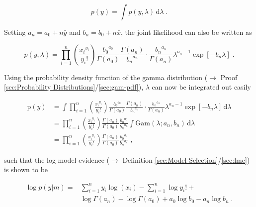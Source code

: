 \documentclass[a4paper,12pt,twoside]{book}
\begin{document}
\begin{equation} \label{eq:poissexp-lme-Poiss-exp-ME}
p(y) = \int p(y,\lambda) \, \mathrm{d}\lambda \; .
\end{equation}

Setting $a_n = a_0 + n \bar{y}$ and $b_n = b_0 + n \bar{x}$, the joint likelihood can also be written as

\begin{equation} \label{eq:poissexp-lme-Poiss-exp-JL-s3}
p(y,\lambda) = \prod_{i=1}^n \left(\frac{ {x_i}^{y_i}}{y_i !}\right) \frac{ {b_0}^{a_0}}{\Gamma(a_0)} \frac{\Gamma(a_n)}{ {b_n}^{a_n}} \cdot \frac{ {b_n}^{a_n}}{\Gamma(a_n)} \lambda^{a_n-1} \exp\left[-b_n \lambda\right] \; .
\end{equation}

Using the probability density function of the gamma distribution ($\rightarrow$ Proof \ref{sec:Probability Distributions}/\ref{sec:gam-pdf}), $\lambda$ can now be integrated out easily

\begin{equation} \label{eq:poissexp-lme-Poiss-exp-ME-qed}
\begin{split}
\mathrm{p}(y) &= \int \prod_{i=1}^n \left(\frac{ {x_i}^{y_i}}{y_i !}\right) \frac{ {b_0}^{a_0}}{\Gamma(a_0)} \frac{\Gamma(a_n)}{ {b_n}^{a_n}} \cdot \frac{ {b_n}^{a_n}}{\Gamma(a_n)} \lambda^{a_n-1} \exp\left[-b_n \lambda\right] \, \mathrm{d}\lambda \\
&= \prod_{i=1}^n \left(\frac{ {x_i}^{y_i}}{y_i !}\right) \frac{\Gamma(a_n)}{\Gamma(a_0)} \frac{ {b_0}^{a_0}}{ {b_n}^{a_n}} \int \mathrm{Gam}(\lambda; a_n, b_n) \, \mathrm{d}\lambda \\
&= \prod_{i=1}^n \left(\frac{ {x_i}^{y_i}}{y_i !}\right) \frac{\Gamma(a_n)}{\Gamma(a_0)} \frac{ {b_0}^{a_0}}{ {b_n}^{a_n}} \; ,
\end{split}
\end{equation}

such that the log model evidence ($\rightarrow$ Definition \ref{sec:Model Selection}/\ref{sec:lme}) is shown to be

\begin{equation} \label{eq:poissexp-lme-Poiss-exp-LME-qed}
\begin{split}
\log p(y|m) = &\sum_{i=1}^n y_i \log(x_i) - \sum_{i=1}^n \log y_i ! + \\ 
&\log \Gamma(a_n) - \log \Gamma(a_0) + a_0 \log b_0 - a_n \log b_n \; .
\end{split}
\end{equation}
\end{document}
